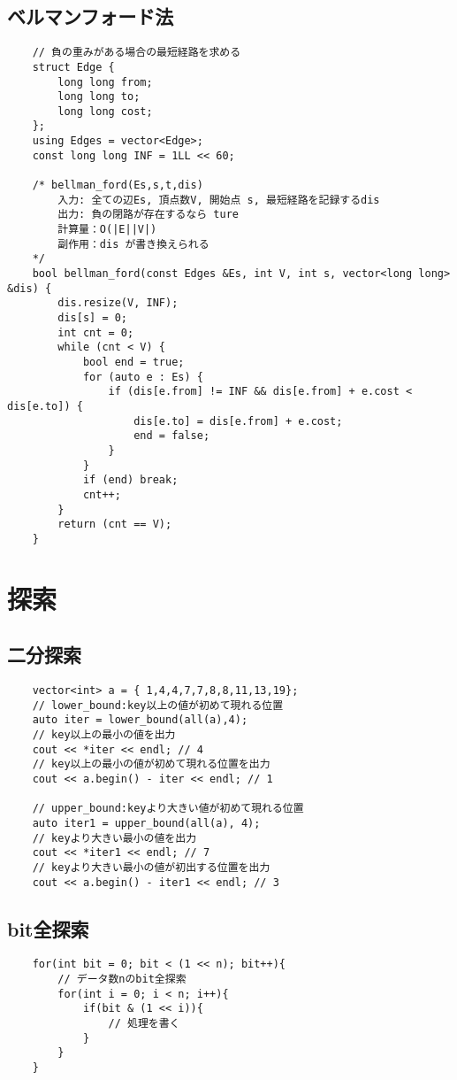 \documentclass[a4paper, landscape, 9pt]{jarticle} %
\begin{document}
\begin{multicols*}{3}
    \subsection{ベルマンフォード法}
    \begin{lstlisting}
    // 負の重みがある場合の最短経路を求める
    struct Edge {
        long long from;
        long long to;
        long long cost;
    };
    using Edges = vector<Edge>;
    const long long INF = 1LL << 60;
    
    /* bellman_ford(Es,s,t,dis)
        入力: 全ての辺Es, 頂点数V, 開始点 s, 最短経路を記録するdis
        出力: 負の閉路が存在するなら ture
        計算量：O(|E||V|)
        副作用：dis が書き換えられる
    */
    bool bellman_ford(const Edges &Es, int V, int s, vector<long long> &dis) {
        dis.resize(V, INF);
        dis[s] = 0;
        int cnt = 0;
        while (cnt < V) {
            bool end = true;
            for (auto e : Es) {
                if (dis[e.from] != INF && dis[e.from] + e.cost < dis[e.to]) {
                    dis[e.to] = dis[e.from] + e.cost;
                    end = false;
                }
            }
            if (end) break;
            cnt++;
        }
        return (cnt == V);
    }    
    \end{lstlisting}

    \section{探索}
    \subsection{二分探索}
    \begin{lstlisting}
    vector<int> a = { 1,4,4,7,7,8,8,11,13,19};
    // lower_bound:key以上の値が初めて現れる位置
    auto iter = lower_bound(all(a),4);
    // key以上の最小の値を出力
    cout << *iter << endl; // 4
    // key以上の最小の値が初めて現れる位置を出力
    cout << a.begin() - iter << endl; // 1

    // upper_bound:keyより大きい値が初めて現れる位置
    auto iter1 = upper_bound(all(a), 4);
    // keyより大きい最小の値を出力
    cout << *iter1 << endl; // 7
    // keyより大きい最小の値が初出する位置を出力
    cout << a.begin() - iter1 << endl; // 3

    \end{lstlisting}

    \subsection{bit全探索}
    \begin{lstlisting}
    for(int bit = 0; bit < (1 << n); bit++){
        // データ数nのbit全探索
        for(int i = 0; i < n; i++){
            if(bit & (1 << i)){
                // 処理を書く
            }
        }
    }
    \end{lstlisting}


\end{multicols*}
\end{document}
